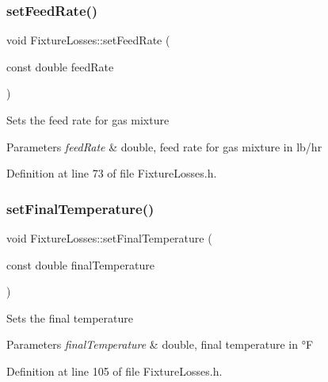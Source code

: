 \subsubsection{\texorpdfstring{set\+Feed\+Rate()}{setFeedRate()}\hspace{0.1cm}{\footnotesize\ttfamily [3/3]}}
{\footnotesize\ttfamily void Fixture\+Losses\+::set\+Feed\+Rate (\begin{DoxyParamCaption}\item[{const double}]{feed\+Rate }\end{DoxyParamCaption})\hspace{0.3cm}{\ttfamily [inline]}}

Sets the feed rate for gas mixture 
\begin{DoxyParams}{Parameters}
{\em feed\+Rate} & double, feed rate for gas mixture in lb/hr \\
\hline
\end{DoxyParams}


Definition at line 73 of file Fixture\+Losses.\+h.

\mbox{\label{class_fixture_losses_a5b65e7118cb96c4f4c88c0d6d1a4f6d3}} 
\subsubsection{\texorpdfstring{set\+Final\+Temperature()}{setFinalTemperature()}\hspace{0.1cm}{\footnotesize\ttfamily [1/3]}}
{\footnotesize\ttfamily void Fixture\+Losses\+::set\+Final\+Temperature (\begin{DoxyParamCaption}\item[{const double}]{final\+Temperature }\end{DoxyParamCaption})\hspace{0.3cm}{\ttfamily [inline]}}

Sets the final temperature 
\begin{DoxyParams}{Parameters}
{\em final\+Temperature} & double, final temperature in °F \\
\hline
\end{DoxyParams}


Definition at line 105 of file Fixture\+Losses.\+h.

\mbox{\label{class_fixture_losses_a5b65e7118cb96c4f4c88c0d6d1a4f6d3}} 
